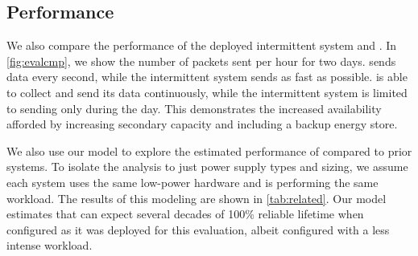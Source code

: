 \subsection{\name Performance}
\label{sec:eval:permamote}
We also compare the performance of the
deployed intermittent system and \name. In \cref{fig:evalcmp}, we show the
number of packets sent per hour for two days. \name sends data every
second, while the intermittent system sends as fast as possible. \name is
able to collect and send its data continuously, while the
intermittent system is limited to sending only during the day. This
demonstrates the increased availability afforded by increasing secondary
capacity and including a backup energy store.

We also use our model to explore the estimated performance of \name
compared to prior systems.
To isolate the analysis to just power supply types and sizing, we assume each
system uses the same low-power hardware and is performing the same workload.
The results of this modeling are shown in \cref{tab:related}. Our model estimates that
\name can expect several decades of 100\% reliable lifetime when configured as
it was deployed for this evaluation, albeit configured with a less intense workload.


